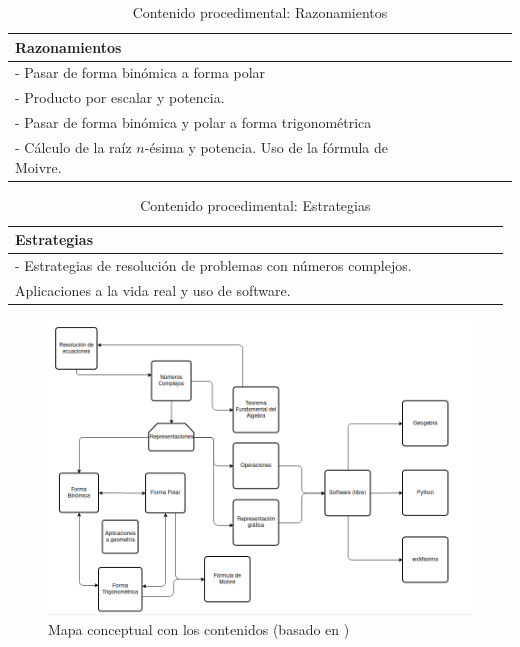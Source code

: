 \documentclass[../main.tex]{memoir}
\begin{document}
\begin{table}[H]
	\centering
	\begin{tabular}{lcccccc}
		\toprule
		\hspace{5cm}Razonamientos \\
		\midrule
		- Pasar de forma binómica a forma polar \\
		- Producto por escalar y potencia. \\
		- Pasar de forma binómica y polar a forma trigonométrica\\
		- Cálculo de la raíz $n$-ésima y potencia. Uso de la fórmula de Moivre.\\
		\bottomrule
	\end{tabular}
	\caption{Contenido procedimental: Razonamientos}
	\label{tab:razonamientos}
\end{table}


\begin{table}[H]
	\centering
	\begin{tabular}{lcccccc}
		\toprule
		\hspace{5cm}Estrategias \\
		\midrule
		- Estrategias de resolución de problemas con números complejos. \\ \hspace{0.2cm}Aplicaciones a la vida real y uso de software. \\
		\bottomrule
	\end{tabular}
	\caption{Contenido procedimental: Estrategias}
	\label{tab:estrategias}
\end{table}


\begin{figure}[H]
	\centering
	\includegraphics[scale=0.4]{images/mapa-conceptual.png}
	\caption{Mapa conceptual con los contenidos (basado en \cite{trigonometria})}
	\label{mapa-conceptual}
\end{figure}
\end{document}
